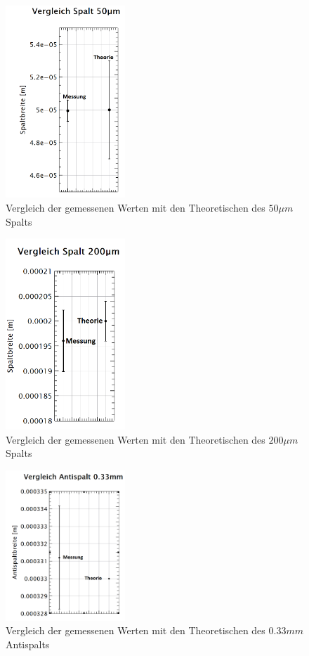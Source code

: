 \begin{figure}[H]
	\centering
	\includegraphics[width=0.4\textwidth]{data/dis_sp_50.png}
	\caption{Vergleich der gemessenen Werten mit den Theoretischen des $50\mu m$ Spalts}
	\label{fig:dis_spalt_50}
\end{figure}
\begin{figure}[H]
	\centering
	\includegraphics[width=0.4\textwidth]{data/dis_sp_200.png}
	\caption{Vergleich der gemessenen Werten mit den Theoretischen des $200\mu m$ Spalts}
	\label{fig:dis_spalt_200}
\end{figure}
\begin{figure}[H]
	\centering
	\includegraphics[width=0.4\textwidth]{data/dis_asp_33.png}
	\caption{Vergleich der gemessenen Werten mit den Theoretischen des $0.33mm$ Antispalts}
	\label{fig:dis_aspalt_33}
\end{figure}
